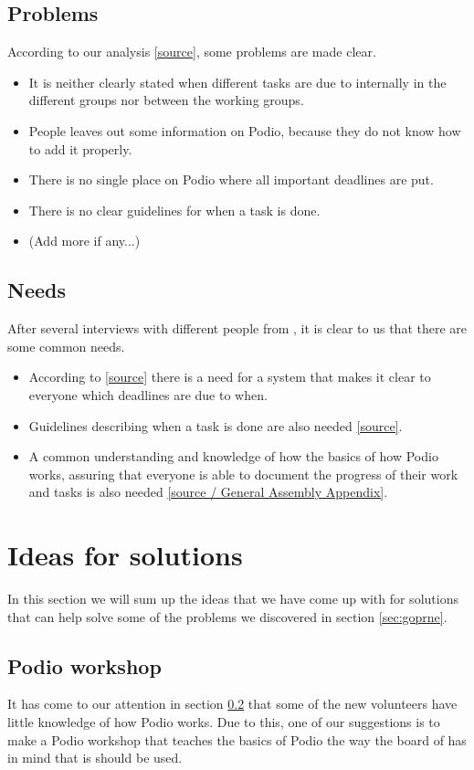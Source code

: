 \subsection{Problems}
\label{subsec:problems}
According to our analysis \ref{source}, some problems are made clear.
\begin{itemize}
    \item It is neither clearly stated when different tasks are due to
    internally in the different groups nor between the working groups.
    \item People leaves out some information on Podio, because they do not know
    how to add it properly.
    \item There is no single place on Podio where all important deadlines are
    put.
    \item There is no clear guidelines for when a task is done.
    \item (Add more if any...)
\end{itemize}

\subsection{Needs}
\label{subsec:needs}
After several interviews with different people from \mil, it is clear to us that
there are some common needs.
\begin{itemize}
    \item According to \ref{source} there is a need for a system that makes it
    clear to everyone which deadlines are due to when.
    \item Guidelines describing when a task is done are also needed
    \ref{source}.
    \item A common understanding and knowledge of how the basics of how Podio
    works, assuring that everyone is able to document the progress of their work
    and tasks is also needed \ref{source / General Assembly Appendix}.
\end{itemize}

\section{Ideas for solutions}
\label{sec:ideas}
In this section we will sum up the ideas that we have come up with for solutions
that can help solve some of the problems we discovered in section \ref{sec:goprne}.

\subsection{Podio workshop}
It has come to our attention in section \ref{subsec:needs} that
some of the new volunteers have little knowledge of how Podio works. Due to
this, one of our suggestions is to make a Podio workshop that teaches the basics
of Podio the way the board of \mil has in mind that is should be used.

